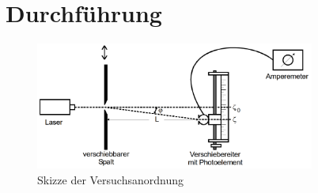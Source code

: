 \section{Durchführung}
\label{sec:Durchführung}



\begin{figure}
  \centering
  \includegraphics[width=260pt]{data/aufbau.png}
  \caption{Skizze der Versuchsanordnung \cite{Versuchsanleitung}}
  \label{fig:aufbau}
\end{figure}
